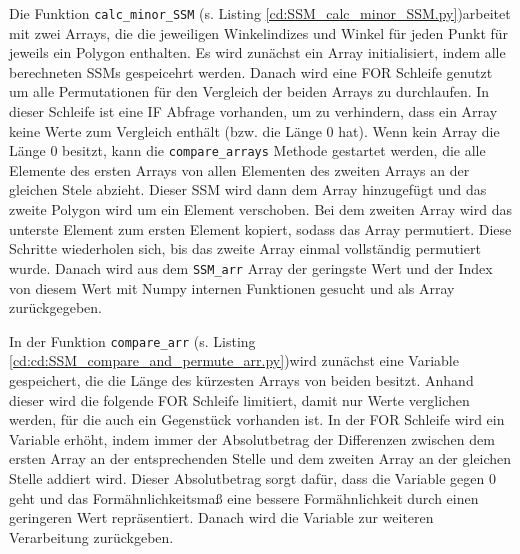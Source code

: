 {	Die Funktion \lstinline|calc_minor_SSM| \ifimportant (s. Listing \ref{cd:SSM_calc_minor_SSM.py})\fi arbeitet mit zwei Arrays, die die jeweiligen Winkelindizes und Winkel für jeden Punkt für jeweils ein Polygon enthalten. Es wird zunächst ein Array initialisiert, indem alle berechneten SSMs gespeicehrt werden. Danach wird eine FOR Schleife genutzt um alle Permutationen für den Vergleich der beiden Arrays zu durchlaufen. In dieser Schleife ist eine IF Abfrage vorhanden, um zu verhindern, dass ein Array keine Werte zum Vergleich enthält (bzw. die Länge 0 hat). Wenn kein Array die Länge 0 besitzt, kann die \lstinline|compare_arrays| Methode gestartet werden, die alle Elemente des ersten Arrays von allen Elementen des zweiten Arrays an der gleichen Stele abzieht. Dieser SSM wird dann dem Array hinzugefügt und das zweite Polygon wird um ein Element verschoben. Bei dem zweiten Array wird das unterste Element zum ersten Element kopiert, sodass das Array permutiert. Diese Schritte wiederholen sich, bis das zweite Array einmal vollständig permutiert wurde. Danach wird aus dem \lstinline|SSM_arr| Array der geringste Wert und der Index von diesem Wert mit Numpy internen Funktionen gesucht und als Array zurückgegeben. \\

	\ifimportant
	
	\fi

	In der Funktion \lstinline|compare_arr| \ifimportant (s. Listing \ref{cd:cd:SSM_compare_and_permute_arr.py})\fi wird zunächst eine Variable gespeichert, die die Länge des kürzesten Arrays von beiden besitzt. Anhand dieser wird die folgende FOR Schleife limitiert, damit nur Werte verglichen werden, für die auch ein Gegenstück vorhanden ist.
	In der FOR Schleife wird ein Variable erhöht, indem immer der Absolutbetrag der Differenzen zwischen dem ersten Array an der entsprechenden Stelle und dem zweiten Array an der gleichen Stelle addiert wird. Dieser Absolutbetrag sorgt dafür, dass die Variable gegen 0 geht und das Formähnlichkeitsmaß eine bessere Formähnlichkeit durch einen geringeren Wert repräsentiert. Danach wird die Variable zur weiteren Verarbeitung zurückgeben.

	\ifimportant
	
	\fi

}







